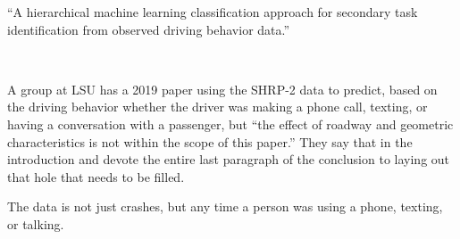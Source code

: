 \documentclass[11pt]{article}
\begin{document}
\begin{spacing}{1.2}
``A hierarchical machine learning classification approach for secondary task identification from observed driving behavior data.''

\

A group at LSU has a 2019 paper using the SHRP-2 data to predict, based on the driving behavior whether the driver was making a phone call, texting, or having a conversation with a passenger, but ``the effect of roadway and geometric characteristics is not within the scope of this paper.''  They say that in the introduction and devote the entire last paragraph of the conclusion to laying out that hole that needs to be filled.  

The data is not just crashes, but any time a person was using a phone, texting, or talking.  


\clearpage
{}
\printindex

\end{spacing}
\end{document}
